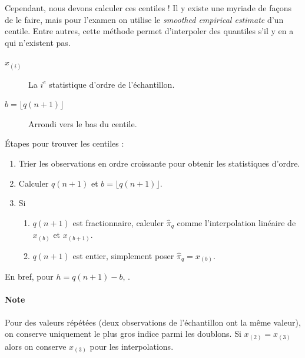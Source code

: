 \documentclass[10pt, french]{article}
\begin{document}
\begin{multicols*}{2}
Cependant, nous devons calculer ces centiles ! Il y existe une myriade de façons de le faire, mais pour l'examen on utilise le  \og \textit{smoothed empirical estimate} \fg{} d'un centile. Entre autres, cette méthode permet d'interpoler des quantiles s'il y en a qui n'existent pas.


\begin{definitionNOHFILLsub}
\begin{distributions}[Notation]
\begin{description}
	\item[$x_{(i)}$]	La $i^{e}$ statistique d'ordre de l'échantillon.
	\item[$b = \lfloor q (n + 1) \rfloor$]	Arrondi vers le bas du centile.
\end{description}
\end{distributions}

Étapes pour trouver les centiles : 
\begin{enumerate}[label = \circled{\arabic*}{trueblue}]
	\item	Trier les observations en ordre croissante pour obtenir les statistiques d'ordre.
	\item	Calculer $q(n + 1)$ et $b = \lfloor q (n + 1) \rfloor$.
	\item	Si 
		\begin{enumerate}[label = \alph*)]
		\item	$q(n + 1)$ est fractionnaire, calculer $\hat{\pi}_{q}$ comme l'interpolation linéaire de $x_{(b)}$ et $x_{(b + 1)}$.
		\item	$q(n + 1)$ est entier, simplement poser $\hat{\pi}_{q} = x_{(b)}$.
		\end{enumerate}
\end{enumerate}

En bref, pour $h = q(n + 1) - b$, .
\end{definitionNOHFILLsub}

\paragraph{Note}	Pour des valeurs répétées (deux observations de l'échantillon ont la même valeur), on conserve uniquement le plus gros indice parmi les doublons. Si $x_{(2)} = x_{(3)}$ alors on conserve $x_{(3)}$ pour les interpolations. 


\end{multicols*}
\end{document}
